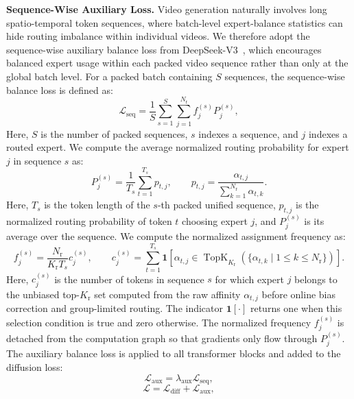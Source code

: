 \noindent\textbf{Sequence-Wise Auxiliary Loss.}
Video generation naturally involves long spatio-temporal token sequences, where batch-level expert-balance statistics can hide routing imbalance within individual videos.
We therefore adopt the sequence-wise auxiliary balance loss from DeepSeek-V3~\cite{deepseek2024v3}, which encourages balanced expert usage within each packed video sequence rather than only at the global batch level.
For a packed batch containing $S$ sequences, the sequence-wise balance loss is defined as:
\begin{equation}
\mathcal{L}_{\mathrm{seq}} = \frac{1}{S}\sum_{s=1}^{S}\sum_{j=1}^{N_{\mathrm{r}}} f_{j}^{(s)} P_{j}^{(s)},
\end{equation}
Here, $S$ is the number of packed sequences, $s$ indexes a sequence, and $j$ indexes a routed expert. We compute the average normalized routing probability for expert $j$ in sequence $s$ as:
\begin{equation}
P_{j}^{(s)} = \frac{1}{T_s}\sum_{t=1}^{T_s} p_{t,j},\qquad p_{t,j} = \frac{\alpha_{t,j}}{\sum_{k=1}^{N_{\mathrm{r}}} \alpha_{t,k}}.
\end{equation}
Here, $T_s$ is the token length of the $s$-th packed unified sequence, $p_{t,j}$ is the normalized routing probability of token $t$ choosing expert $j$, and $P_j^{(s)}$ is its average over the sequence. We compute the normalized assignment frequency as:
\begin{equation}
f_{j}^{(s)} = \frac{N_{\mathrm{r}}}{K_{\mathrm{r}}T_s}c_{j}^{(s)},\qquad c_{j}^{(s)} = \sum_{t=1}^{T_s}\mathbf{1}\left[\alpha_{t,j} \in \operatorname{TopK}_{K_{\mathrm{r}}}(\{\alpha_{t,k} \mid 1 \le k \le N_{\mathrm{r}}\})\right].
\end{equation}
Here, $c_j^{(s)}$ is the number of tokens in sequence $s$ for which expert $j$ belongs to the unbiased top-$K_{\mathrm{r}}$ set computed from the raw affinity $\alpha_{t,j}$ before online bias correction and group-limited routing. The indicator $\mathbf{1}[\cdot]$ returns one when this selection condition is true and zero otherwise. The normalized frequency $f_j^{(s)}$ is detached from the computation graph so that gradients only flow through $P_j^{(s)}$. The auxiliary balance loss is applied to all transformer blocks and added to the diffusion loss:
\begin{equation}
\mathcal{L}_{\mathrm{aux}} = \lambda_{\mathrm{aux}}\mathcal{L}_{\mathrm{seq}},
\end{equation}
\begin{equation}
\mathcal{L} = \mathcal{L}_{\mathrm{diff}} + \mathcal{L}_{\mathrm{aux}},
\end{equation}
